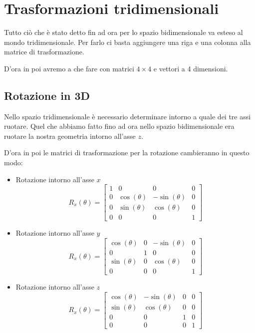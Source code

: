 \section{Trasformazioni tridimensionali}
Tutto ci\`o che \`e stato detto fin ad ora per lo spazio bidimensionale va esteso al mondo
tridimensionale. Per farlo ci basta aggiungere una riga e una colonna alla matrice di
trasformazione.

D'ora in poi avremo a che fare con matrici $4 \times 4$ e vettori a 4 dimensioni.

\subsection{Rotazione in 3D}
Nello spazio tridimensionale \`e necessario determinare intorno a quale dei tre assi ruotare.
Quel che abbiamo fatto fino ad ora nello spazio bidimensionale era ruotare la nostra
geometria intorno all'asse $z$.

D'ora in poi le matrici di trasformazione per la rotazione cambieranno in questo modo:
\begin{itemize}
	\item Rotazione intorno all'asse $x$
	      \[
		      R_x(\theta) = \begin{bmatrix}
			      1 & 0            & 0             & 0 \\
			      0 & \cos(\theta) & -\sin(\theta) & 0 \\
			      0 & \sin(\theta) & \cos(\theta)  & 0 \\
			      0 & 0            & 0             & 1
		      \end{bmatrix}
	      \]
	\item Rotazione intorno all'asse $y$
	      \[
		      R_x(\theta) = \begin{bmatrix}
			      \cos(\theta) & 0 & -\sin(\theta) & 0 \\
			      0            & 1 & 0             & 0 \\
			      \sin(\theta) & 0 & \cos(\theta)  & 0 \\
			      0            & 0 & 0             & 1
		      \end{bmatrix}
	      \]
	\item Rotazione intorno all'asse $z$
	      \[
		      R_x(\theta) = \begin{bmatrix}
			      \cos(\theta) & -\sin(\theta) & 0 & 0 \\
			      \sin(\theta) & \cos(\theta)  & 0 & 0 \\
			      0            & 0             & 1 & 0 \\
			      0            & 0             & 0 & 1
		      \end{bmatrix}
	      \]
\end{itemize}

